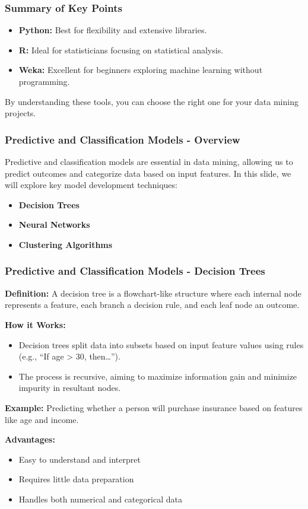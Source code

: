 \documentclass[aspectratio=169]{beamer}
\begin{document}
\begin{frame}
    \frametitle{Summary of Key Points}
    \begin{itemize}
        \item \textbf{Python:} Best for flexibility and extensive libraries.
        \item \textbf{R:} Ideal for statisticians focusing on statistical analysis.
        \item \textbf{Weka:} Excellent for beginners exploring machine learning without programming.
    \end{itemize}

    By understanding these tools, you can choose the right one for your data mining projects.
\end{frame}

\begin{frame}[fragile]
    \frametitle{Predictive and Classification Models - Overview}
    Predictive and classification models are essential in data mining, allowing us to predict outcomes and categorize data based on input features. 
    In this slide, we will explore key model development techniques: 
    \begin{itemize}
        \item \textbf{Decision Trees}
        \item \textbf{Neural Networks}
        \item \textbf{Clustering Algorithms}
    \end{itemize}
\end{frame}

\begin{frame}[fragile]
    \frametitle{Predictive and Classification Models - Decision Trees}
    \textbf{Definition:} A decision tree is a flowchart-like structure where each internal node represents a feature, each branch a decision rule, and each leaf node an outcome.

    \textbf{How it Works:} 
    \begin{itemize}
        \item Decision trees split data into subsets based on input feature values using rules (e.g., “If age > 30, then…”).
        \item The process is recursive, aiming to maximize information gain and minimize impurity in resultant nodes.
    \end{itemize}
    
    \textbf{Example:} Predicting whether a person will purchase insurance based on features like age and income.
    
    \textbf{Advantages:}
    \begin{itemize}
        \item Easy to understand and interpret
        \item Requires little data preparation
        \item Handles both numerical and categorical data
    \end{itemize}
\end{frame}
\end{document}
